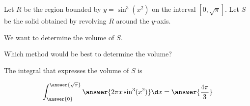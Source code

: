 \documentclass{ximera}
\author{Jason Miller}
\begin{document}
\begin{exercise}
Let $R$ be the region bounded by $y=\sin^{3}(x^{2})$ on the interval $\left[ 0, \sqrt{\pi} \right]$. Let $S$ be the solid obtained by revolving $R$ around the $y$-axis. 

We want to determine the volume of $S$. 


Which method would be best to determine the volume? 

\begin{multipleChoice}
\end{multipleChoice}

The integral that expresses the volume of $S$ is 

\begin{exercise}

\[
\int_{\answer{0}}^{\answer{ \sqrt{\pi}}} \answer{2\pi x \sin^{3}(x^{2})} \d x=\answer{    \frac{4\pi}{3}       }
\]



\end{exercise}



\end{exercise}
\end{document}
